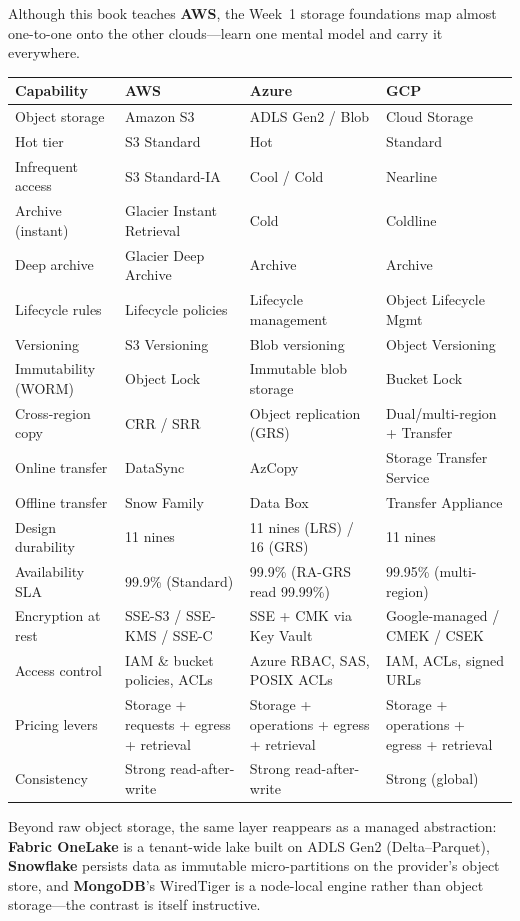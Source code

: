 \begin{crosscloud}
Although this book teaches \textbf{AWS}, the Week~1 storage foundations map almost one-to-one onto the other clouds---learn one mental model and carry it everywhere.

\vspace{2mm}
{\footnotesize
\begin{tabular}{@{}p{2.8cm}p{3.0cm}p{3.0cm}p{3.0cm}@{}}
\toprule
\textbf{Capability} & \textbf{AWS} & \textbf{Azure} & \textbf{GCP} \\
\midrule
Object storage & Amazon S3 & ADLS Gen2 / Blob & Cloud Storage \\
Hot tier & S3 Standard & Hot & Standard \\
Infrequent access & S3 Standard-IA & Cool / Cold & Nearline \\
Archive (instant) & Glacier Instant Retrieval & Cold & Coldline \\
Deep archive & Glacier Deep Archive & Archive & Archive \\
Lifecycle rules & Lifecycle policies & Lifecycle management & Object Lifecycle Mgmt \\
Versioning & S3 Versioning & Blob versioning & Object Versioning \\
Immutability (WORM) & Object Lock & Immutable blob storage & Bucket Lock \\
Cross-region copy & CRR / SRR & Object replication (GRS) & Dual/multi-region + Transfer \\
Online transfer & DataSync & AzCopy & Storage Transfer Service \\
Offline transfer & Snow Family & Data Box & Transfer Appliance \\
\addlinespace
Design durability & 11 nines & 11 nines (LRS) / 16 (GRS) & 11 nines \\
Availability SLA & 99.9\% (Standard) & 99.9\% (RA-GRS read 99.99\%) & 99.95\% (multi-region) \\
Encryption at rest & SSE-S3 / SSE-KMS / SSE-C & SSE + CMK via Key Vault & Google-managed / CMEK / CSEK \\
Access control & IAM \& bucket policies, ACLs & Azure RBAC, SAS, POSIX ACLs & IAM, ACLs, signed URLs \\
Pricing levers & Storage + requests + egress + retrieval & Storage + operations + egress + retrieval & Storage + operations + egress + retrieval \\
Consistency & Strong read-after-write & Strong read-after-write & Strong (global) \\
\bottomrule
\end{tabular}}

\vspace{1mm}
Beyond raw object storage, the same layer reappears as a managed abstraction: \textbf{Fabric OneLake} is a tenant-wide lake built on ADLS Gen2 (Delta--Parquet), \textbf{Snowflake} persists data as immutable micro-partitions on the provider's object store, and \textbf{MongoDB}'s WiredTiger is a node-local engine rather than object storage---the contrast is itself instructive.
\end{crosscloud}

